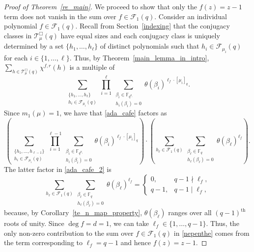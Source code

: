 \documentclass[10pt]{article}
\theoremstyle{definition}
\newcommand{\F}{\mathbb{F}}
\newcommand{\CF}{\mathcal{F}}
\newcommand{\CT}{\mathcal{T}}
\newcommand{\te}{\theta}
\begin{document}
\begin{proof}[Proof of Theorem~\ref{re_main}]
We proceed to show that only the \(f(z) = z-1\) term does not vanish in the sum over \(f \in \CF_1(q)\).
Consider an individual polynomial \(f \in \CF_1 (q)\).
Recall from Section~\ref{indexing} that the conjugacy classes in \(\CT_\mu^\Box (q)\) have equal sizes and each conjugacy class is uniquely determined by a set \(\{h_1,\ldots,h_\ell\}\) of distinct polynomials such that \(h_i \in \CF_{\mu_i} (q)\) for each \(i \in \{1,\ldots,\ell\}\).
Thus,
by Theorem~\ref{main_lemma_in_intro},
\(\sum_{h \in \CT_\mu^\Box (q)} \chi^{f,r} (h)\) is a multiple of
\begin{equation}
\label{ada_cafe}
\sum_{\substack{\{h_1,\ldots,h_\ell\} \\ h_i \in \CF_{\mu_i} (q)}}
\prod_{i=1}^\ell
\sum_{\substack{\beta_i \in \F_{q^{\mu_i}} \\ h_i(\beta_i) = 0}} \te(\beta_i)^{\ell_f \cdot [\mu_i]_q}.
\end{equation}
Since \(m_1(\mu) = 1\), we have that \eqref{ada_cafe} factors as
\begin{equation}
\label{ada_cafe_2}
\left (
\sum_{\substack{\{h_1,\ldots,h_{\ell-1}\} \\ h_i \in \CF_{\mu_i} (q)}}
\prod_{i=1}^{\ell-1}
\sum_{\substack{\beta_i \in \F_{q^{\mu_i}} \\ h_i(\beta_i) = 0}} \te(\beta_i)^{\ell_f \cdot [\mu_i]_q}
\right )
\cdot
\left (
\sum_{h_\ell \in \CF_{1} (q)}
\sum_{\substack{\beta_\ell \in \F_{q} \\ h_\ell(\beta_\ell) = 0}} \te(\beta_\ell)^{\ell_f}
\right ).
\end{equation}
The latter factor in \eqref{ada_cafe_2} is
\[
\sum_{h_\ell \in \CF_1 (q)} \sum_{\substack{\beta_\ell \in \F_q \\ h_\ell(\beta_\ell) = 0}} \te(\beta_\ell)^{\ell_f}
=
\begin{cases}
0, & q-1 \nmid \ell_f, \\
q-1, & q-1 \mid \ell_f,
\end{cases}
\]
because, by Corollary~\ref{te_n_map_property}, \(\te(\beta_\ell)\) ranges over all \((q-1)^\text{th}\) roots of unity.
Since \(\deg f = d = 1\), we can take \(\ell_f \in \{1,\ldots,q-1\}\).
Thus, the only non-zero contribution to the sum over \(f \in \CF_1(q)\) in \eqref{nepenthe} comes from the term corresponding to \(\ell_f = q-1\) and hence \(f(z) = z-1\).


\end{proof}
\end{document}
